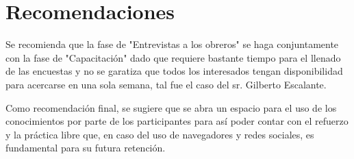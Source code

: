 \chapter*{Recomendaciones}
    Se recomienda que la fase de "Entrevistas a los obreros" se haga conjuntamente con la fase de "Capacitación" dado que requiere bastante tiempo para el llenado de las encuestas y no se garatiza que todos los interesados tengan disponibilidad para acercarse en una sola semana, tal fue el caso del sr. Gilberto Escalante.
    
    Como recomendación final, se sugiere que se abra un espacio para el uso de los conocimientos por parte de los participantes para así poder contar con el refuerzo y la práctica libre que, en caso del uso de navegadores y redes sociales, es fundamental para su futura retención.
    
    \pagebreak